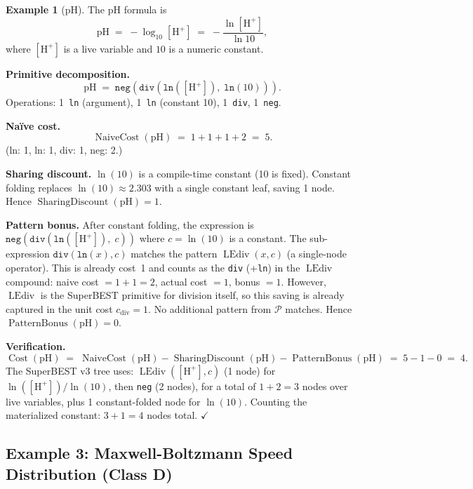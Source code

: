 \documentclass[12pt,a4paper]{article}
\theoremstyle{definition}
\newtheorem{example}[theorem]{Example}
\newcommand{\LEdiv}{\operatorname{LEdiv}}
\newcommand{\Cost}{\operatorname{Cost}}
\newcommand{\NC}{\operatorname{NaiveCost}}
\newcommand{\SD}{\operatorname{SharingDiscount}}
\newcommand{\PB}{\operatorname{PatternBonus}}
\begin{document}
\begin{example}[pH]
\label{ex:pH}
The pH formula is
\[
  \mathrm{pH} \;=\; -\log_{10}[\mathrm{H}^+]
              \;=\; -\frac{\ln[\mathrm{H}^+]}{\ln 10},
\]
where $[\mathrm{H}^+]$ is a live variable and $10$ is a numeric constant.

\textbf{Primitive decomposition.}
\[
  \mathrm{pH} \;=\; \texttt{neg}\!\left(\texttt{div}\!\left(\texttt{ln}([\mathrm{H}^+]),\; \texttt{ln}(10)\right)\right).
\]
Operations: 1~\texttt{ln} (argument), 1~\texttt{ln} (constant 10),
1~\texttt{div}, 1~\texttt{neg}.

\textbf{Na\"{i}ve cost.}
\[
  \NC(\mathrm{pH}) \;=\; 1 + 1 + 1 + 2 \;=\; 5.
\]
(ln: 1, ln: 1, div: 1, neg: 2.)

\textbf{Sharing discount.}
$\ln(10)$ is a compile-time constant (10 is fixed).  Constant folding replaces
$\ln(10) \approx 2.303$ with a single constant leaf, saving 1 node.
Hence $\SD(\mathrm{pH}) = 1$.

\textbf{Pattern bonus.}
After constant folding, the expression is
$\texttt{neg}(\texttt{div}(\texttt{ln}([\mathrm{H}^+]),\; c))$
where $c = \ln(10)$ is a constant.  The sub-expression
$\texttt{div}(\texttt{ln}(x), c)$ matches the pattern $\LEdiv(x, c)$ (a
single-node operator).  This is already cost~1 and counts as the \texttt{div}
(+\texttt{ln}) in the $\LEdiv$ compound: naive cost $= 1 + 1 = 2$, actual
cost $= 1$, bonus $= 1$.  However, $\LEdiv$ is the SuperBEST primitive for
division itself, so this saving is already captured in the unit cost
$c_{\mathrm{div}} = 1$.  No additional pattern from $\mathcal{P}$ matches.
Hence $\PB(\mathrm{pH}) = 0$.

\textbf{Verification.}
\[
  \Cost(\mathrm{pH}) \;=\; \NC(\mathrm{pH}) - \SD(\mathrm{pH}) - \PB(\mathrm{pH})
               \;=\; 5 - 1 - 0 \;=\; 4.
\]
The SuperBEST v3 tree uses: $\LEdiv([\mathrm{H}^+], c)$ (1 node) for
$\ln([\mathrm{H}^+])/\ln(10)$, then \texttt{neg} (2 nodes), for a total of
$1 + 2 = 3$ nodes over live variables, plus 1 constant-folded node for
$\ln(10)$.  Counting the materialized constant: $3 + 1 = 4$ nodes total.
\hfill$\checkmark$
\end{example}

\subsection{Example 3: Maxwell-Boltzmann Speed Distribution (Class D)}
\end{document}
